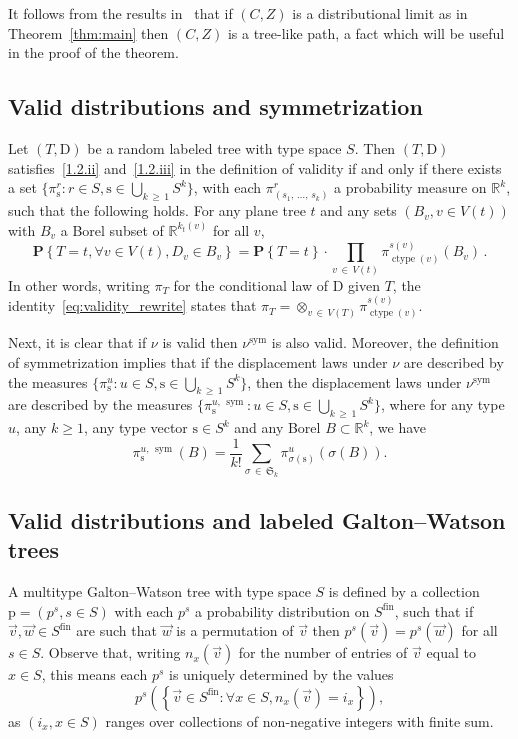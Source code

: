 \documentclass[AHL,Unicode,longabstracts,published]{cedram}
\providecommand{\R}{}
\renewcommand{\R}{\mathbb{R}}
\newcommand{\frkS}{\mathfrak{S}}
\newcommand{\rD}{\mathrm{D}}
\newcommand{\rs}{\mathrm{s}}
\newcommand{\rp}{\mathrm{p}}
\DeclareMathOperator{\sym}{sym}
\DeclareMathOperator{\cht}{ctype}
\DeclareMathOperator{\fin}{fin}
\newcommand{\p}[1]{\mathbf{P}\left\{#1\right\}}
\let\oldforall\forall
\renewcommand*{\forall}{\mathrel{\oldforall}}
\newcommand{\R}{\mathbb{R}}
\begin{document}
It follows from the results in~\cite{MarckertMokkademSnake} that if $(C,Z)$ is a distributional limit as in Theorem~\ref{thm:main} then $(C,Z)$ is a tree-like path, a fact which will be useful in the proof of the theorem.

\subsection{Valid distributions and symmetrization}\label{sub:validAndSymmetric}
Let $(T,\rD)$ be a random labeled tree with type space $S$. Then $(T,\rD)$ satisfies~\eqref{1.2.ii} and~\eqref{1.2.iii} in the definition of validity if and only if there exists a set $\{\pi^r_{\rs}: r \in S, \rs \in \bigcup_{k\,\ge\,1} S^k\}$, with each $\pi^r_{(s_1,\,\ldots,\,s_k)}$ a probability measure on $\R^k$, such that the following holds. For any plane tree $t$ and any sets $(B_v,v \in V(t))$ with $B_v$ a Borel subset of $\R^{k_t(v)}$ for all $v$,
\begin{equation}\label{eq:validity_rewrite}
\p{T=t, \forall v \in V(t), D_v \in B_v} = \p{T=t} \cdot \prod_{v\,\in\,V(t)} \pi^{s(v)}_{\cht(v)}(B_v)\,.
\end{equation}
In other words, writing $\pi_T$ for the conditional law of $\rD$ given $T$, the identity~\eqref{eq:validity_rewrite} states that $\pi_T = \otimes_{v\,\in\,V(T)} \pi_{\cht(v)}^{s(v)}$.

Next, it is clear that if $\nu$ is valid then $\nu^{\sym}$ is also valid. Moreover, the definition of symmetrization implies that if the displacement laws under $\nu$ are described by the measures $\{\pi^u_{\rs}: u \in S, \rs \in \bigcup_{k\,\ge\, 1} S^k\}$, then the displacement laws under $\nu^{\sym}$ are described by the measures $\{\pi^{u,\,\sym}_{\rs}: u \in S, \rs \in \bigcup_{k\,\ge\,1} S^k\}$, where for any type $u$, any $k \ge 1$, any type vector $\rs \in S^k$ and any Borel $B \subset \R^k$, we have
\begin{equation}\label{def:piSym}
\pi^{u,\,\sym}_{\rs} (B) = \frac{1}{k!}\sum_{\sigma\,\in \,\frkS_k} \pi^{u}_{\sigma(\rs)}(\sigma(B)).
\end{equation}


\subsection{Valid distributions and labeled Galton--Watson trees}\label{sub:validAndGW}
A multitype Galton--Watson tree with type space $S$ is defined by a collection $\rp=(p^s,s \in S)$ with each $p^s$ a probability distribution on $S^{\fin}$, such that if $\vec{v},\vec{w} \in S^{\fin}$ are such that $\vec{w}$ is a permutation of $\vec{v}$ then $p^s(\vec{v})=p^s(\vec{w})$ for all $s \in S$. Observe that, writing $n_x(\vec{v})$ for the number of entries of $\vec{v}$ equal to $x \in S$, this means each $p^s$ is uniquely determined by the values
\[
p^s\left(\left\{\vec{v} \in S^{\fin}: \forall x \in S, n_x(\vec{v})=i_x\right\}\right),
\]
as $(i_x,x \in S)$ ranges over collections of non-negative integers with finite sum.
\end{document}
